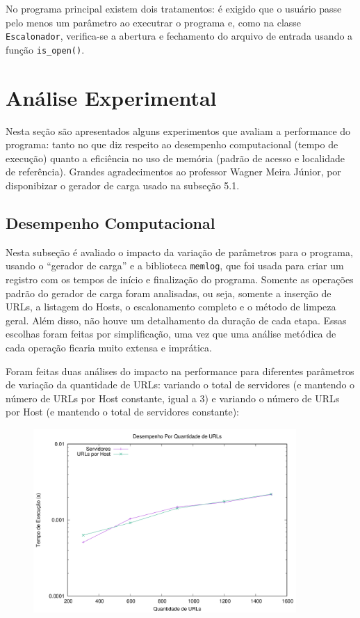 \documentclass{article}
\def\code#1{\texttt{#1}}
\begin{document}
No programa principal existem dois tratamentos: é exigido que o usuário passe pelo menos um parâmetro ao executrar o programa e, como na classe \code{Escalonador}, verifica-se a abertura e fechamento do arquivo de entrada usando a função \code{is\_open()}. 

\section{Análise Experimental}

Nesta seção são apresentados alguns experimentos que avaliam a performance do programa: tanto no que diz respeito ao desempenho computacional (tempo de execução) quanto a eficiência no uso de memória (padrão de acesso
e localidade de referência). Grandes agradecimentos ao professor Wagner Meira Júnior, por disponibizar o gerador de carga usado na subseção 5.1.

\subsection{Desempenho Computacional}

Nesta subseção é avaliado o impacto da variação de parâmetros para o programa, usando o ``gerador de carga'' e a biblioteca \code{memlog}, que foi usada para criar um registro com os tempos de início e finalização do programa. Somente as operações padrão do gerador de carga foram analisadas, ou seja, somente a inserção de URLs, a listagem do Hosts, o escalonamento completo e o método de limpeza geral. Além disso, não houve um detalhamento da duração de cada etapa. Essas escolhas foram feitas por simplificação, uma vez que uma análise metódica de cada operação ficaria muito extensa e imprática.

Foram feitas duas análises do impacto na performance para diferentes parâmetros de variação da quantidade de URLs: variando o total de servidores (e mantendo o número de URLs por Host constante, igual a 3) e variando o número de URLs por Host (e mantendo o total de servidores constante):

\begin{figure} [H]
    \includegraphics[width=10cm]{comp-perf.png} 
    \centering
\end{figure}
\end{document}
